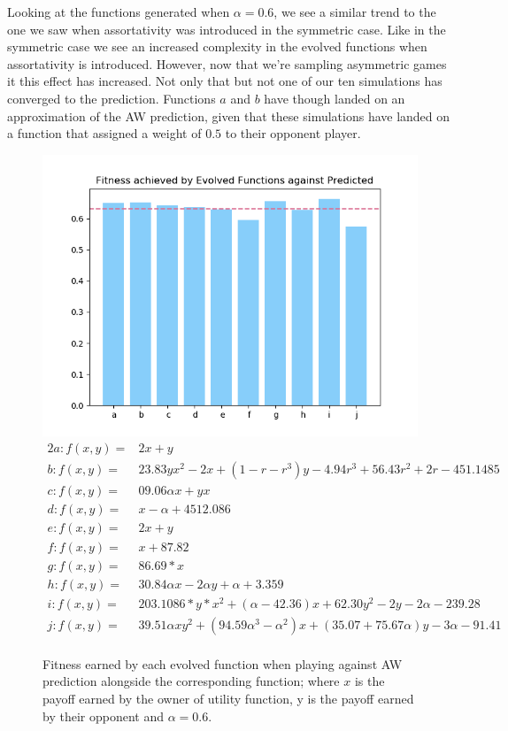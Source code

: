 \documentclass[11pt]{book}
\newcommand*{\np}{\par\noindent\newline}
\begin{document}
\np Looking at the functions generated when $\alpha = 0.6$, we see a similar trend to the one we saw when assortativity was introduced in the symmetric case.
Like in the symmetric case we see an increased complexity in the evolved functions when assortativity is introduced.
However, now that we're sampling asymmetric games it this effect has increased.
Not only that but not one of our ten simulations has converged to the prediction.
Functions $a$ and $b$ have though landed on an approximation of the AW prediction, given that these simulations have landed on a function that assigned a weight of $0.5$ to their opponent player.


\begin{figure}
	\centering
	\includegraphics[scale=0.7]{resources/ylim_barchart_fitness_earned_against_target_asymmetric_r_06.png}
	\begin{alignat*}{2}
		a: f(x, y) = & 2x + y\\
		b: f(x, y) = & 23.83yx^2 - 2x + (1 - r - r^3)y - 4.94r^3 + 56.43r ^2 + 2r - 451.1485\\
		c: f(x, y) = & 09.06\alpha x + yx\\
		d: f(x, y) = & x - \alpha + 4512.086\\
		e: f(x, y) = & 2x + y\\
		f: f(x, y) = & x+87.82\\
		g: f(x, y) = & 86.69*x\\
		h: f(x, y) = & 30.84\alpha x - 2\alpha y +\alpha + 3.359\\
		i: f(x, y) = & 203.1086*y*x^2 +(\alpha - 42.36)x + 62.30y^2 - 2y  -2\alpha -239.28\\
		j: f(x, y) = & 39.51\alpha xy^2 + (94.59\alpha^3 - \alpha^2)x + (35.07 + 75.67\alpha)y - 3\alpha - 91.41\\
	\end{alignat*}
	\caption{Fitness earned by each evolved function when playing against AW prediction alongside the corresponding function; where $x$ is the payoff earned by the owner of utility function, y is the payoff earned by their opponent and $\alpha = 0.6$.}
	\label{barchart_fitness_earned_against_target_asymmetric_r_06}
\end{figure}
\end{document}
